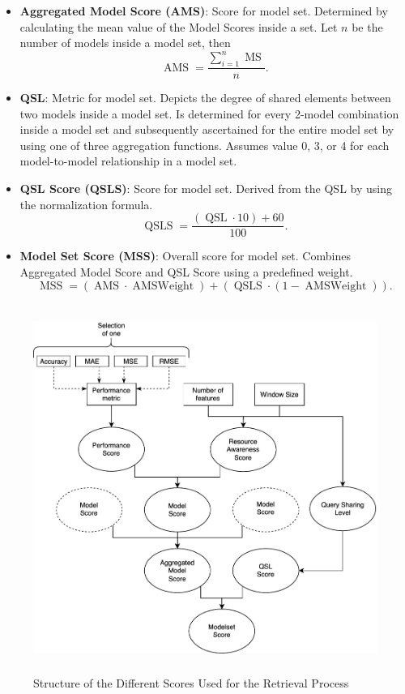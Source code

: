 \begin{itemize}
\item \textbf{Aggregated Model Score (AMS)}: Score for model set. Determined by calculating the mean value of the Model Scores inside a set. Let $n$ be the number of models inside a model set, then
\begin{equation}
  \operatorname{AMS} = \frac{\sum_{i=1}^{n} \operatorname{MS}}{n}.
  \label{ams}
  \end{equation}
  
\item \textbf{QSL}: Metric for model set. Depicts the degree of shared elements between two models inside a model set. Is determined for every 2-model combination inside a model set and subsequently ascertained for the entire model set by using one of three aggregation functions. Assumes value 0, 3, or 4 for each model-to-model relationship in a model set.

\item \textbf{QSL Score (QSLS)}: Score for model set. Derived from the QSL by using the normalization formula.
\begin{equation}
  \operatorname{QSLS} = \frac{(\operatorname{QSL} \cdot 10) + 60}{100}.
  \label{qsls}
  \end{equation}
  
\item \textbf{Model Set Score (MSS)}: Overall score for model set. Combines Aggregated Model Score and QSL Score using a predefined weight.
\begin{equation}
  \operatorname{MSS} = (\operatorname{AMS} \cdot \operatorname{AMSWeight}) + (\operatorname{QSLS} \cdot (1- \operatorname{AMSWeight})).
   \label{mss}
   \end{equation}
\end{itemize}


\begin{figure}[htb]
  \centering
\includegraphics[height=12cm]{graphics/scores.pdf}
  \caption{Structure of the Different Scores Used for the Retrieval Process}
  \label{scoreconstruction}
\end{figure}




